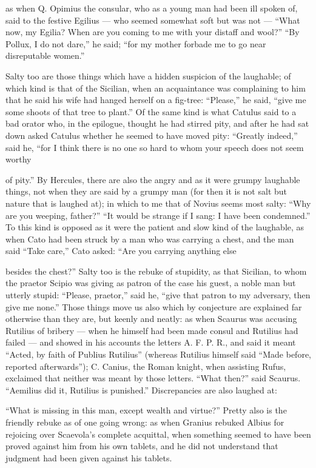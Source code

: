  as when Q. Opimius the consular, who as a young man had been ill spoken of, said to the festive Egilius — who seemed somewhat soft but was not — ``What now, my Egilia? When are you coming to me with your distaff and wool?'' ``By Pollux, I do not dare,'' he said; ``for my mother forbade me to go near disreputable women.''

 Salty too are those things which have a hidden suspicion of the laughable; of which kind is that of the Sicilian, when an acquaintance was complaining to him that he said his wife had hanged herself on a fig-tree: ``Please,'' he said, ``give me some shoots of that tree to plant.'' Of the same kind is what Catulus said to a bad orator who, in the epilogue, thought he had stirred pity, and after he had sat down asked Catulus whether he seemed to have moved pity: ``Greatly indeed,'' said he, ``for I think there is no one so hard to whom your speech does not seem worthy

 of pity.'' By Hercules, there are also the angry and as it were grumpy laughable things, not when they are said by a grumpy man (for then it is not salt but nature that is laughed at); in which to me that of Novius seems most salty: ``Why are you weeping, father?'' ``It would be strange if I sang: I have been condemned.'' To this kind is opposed as it were the patient and slow kind of the laughable, as when Cato had been struck by a man who was carrying a chest, and the man said ``Take care,'' Cato asked: ``Are you carrying anything else

 besides the chest?'' Salty too is the rebuke of stupidity, as that Sicilian, to whom the praetor Scipio was giving as patron of the case his guest, a noble man but utterly stupid: ``Please, praetor,'' said he, ``give that patron to my adversary, then give me none.'' Those things move us also which by conjecture are explained far otherwise than they are, but keenly and neatly: as when Scaurus was accusing Rutilius of bribery — when he himself had been made consul and Rutilius had failed — and showed in his accounts the letters A. F. P. R., and said it meant ``Acted, by faith of Publius Rutilius'' (whereas Rutilius himself said ``Made before, reported afterwards''); C. Canius, the Roman knight, when assisting Rufus, exclaimed that neither was meant by those letters. ``What then?'' said Scaurus. ``Aemilius did it, Rutilius is punished.'' Discrepancies are also laughed at:

 ``What is missing in this man, except wealth and virtue?'' Pretty also is the friendly rebuke as of one going wrong: as when Granius rebuked Albius for rejoicing over Scaevola's complete acquittal, when something seemed to have been proved against him from his own tablets, and he did not understand that judgment had been given against his tablets.

